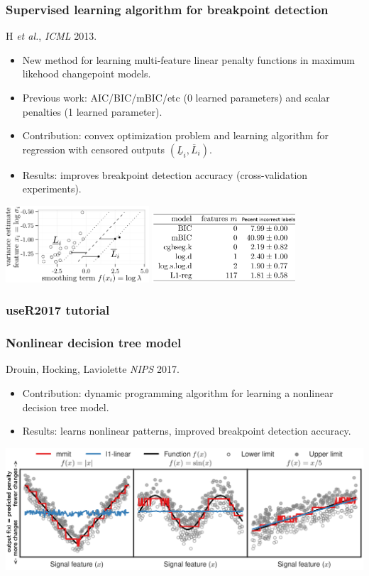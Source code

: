 \documentclass{beamer}
\begin{document}
\begin{frame}
  \frametitle{Supervised learning algorithm for breakpoint detection}
  H {\it et al.}, {\it ICML} 2013.
  \begin{itemize}
  \item New method for learning multi-feature linear penalty
    functions in maximum likehood changepoint models.
  \item Previous work: AIC/BIC/mBIC/etc (0 learned parameters)
    and scalar penalties (1 learned parameter).
  \item Contribution: convex optimization problem and learning
    algorithm for regression with censored outputs
    $(\underline L_i, \overline L_i)$.
  \item Results: improves breakpoint detection accuracy (cross-validation experiments).
  \end{itemize}
\includegraphics[width=0.4\textwidth]{screenshot-mmir-crop}
\includegraphics[width=0.4\textwidth]{screenshot-mmir-test-error}
\end{frame}

\begin{frame}
  \frametitle{useR2017 tutorial}
  
\end{frame}

\begin{frame}
  \frametitle{Nonlinear decision tree model}
  Drouin, Hocking, Laviolette {\it NIPS} 2017.
  \begin{itemize}
  \item Contribution: dynamic programming algorithm for learning a
    nonlinear decision tree model.
  \item Results: learns nonlinear patterns, improved
    breakpoint detection accuracy.
  \end{itemize}

\includegraphics[width=\textwidth]{screenshot-mmit-learned}
\end{frame}
\end{document}
